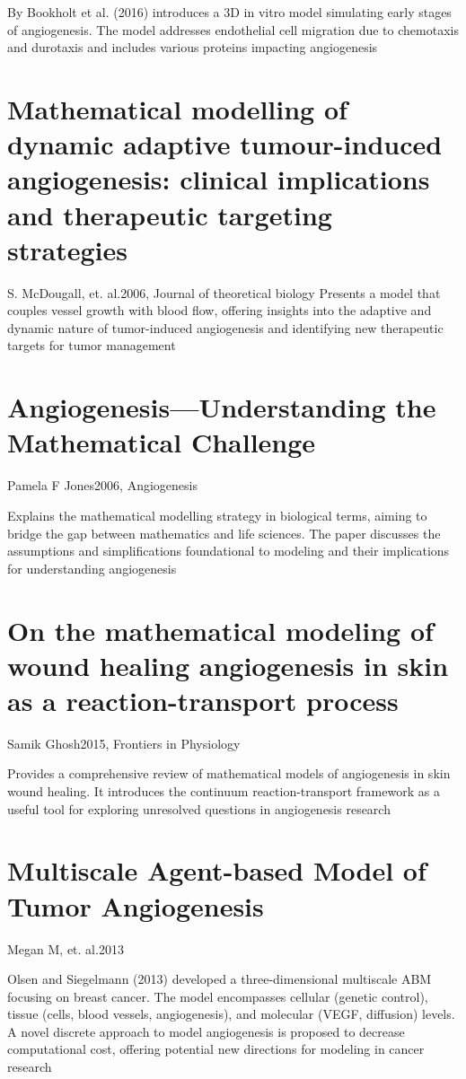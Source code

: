 By Bookholt et al. (2016) introduces a 3D in vitro model simulating early stages of angiogenesis. The model addresses endothelial cell migration due to chemotaxis and durotaxis and includes various proteins impacting angiogenesis \cite{Bookholt2016}

\section{Mathematical modelling of dynamic adaptive tumour-induced angiogenesis: clinical implications and therapeutic targeting strategies}{S. McDougall, et. al.}{2006, Journal of theoretical biology}
Presents a model that couples vessel growth with blood flow, offering insights into the adaptive and dynamic nature of tumor-induced angiogenesis and identifying new therapeutic targets for tumor management \cite{McDougall2006}

\section{Angiogenesis—Understanding the Mathematical Challenge}{Pamela F Jones}{2006, Angiogenesis}

Explains the mathematical modelling strategy in biological terms, aiming to bridge the gap between mathematics and life sciences. The paper discusses the assumptions and simplifications foundational to modeling and their implications for understanding angiogenesis \cite{Jones2006}

\section{On the mathematical modeling of wound healing angiogenesis in skin as a reaction-transport process}{Samik Ghosh}{2015, Frontiers in Physiology}

Provides a comprehensive review of mathematical models of angiogenesis in skin wound healing. It introduces the continuum reaction-transport framework as a useful tool for exploring unresolved questions in angiogenesis research \cite{Ghosh2015} 

\section{Multiscale Agent-based Model of Tumor Angiogenesis}{Megan M, et. al.}{2013}

Olsen and Siegelmann (2013) developed a three-dimensional multiscale ABM focusing on breast cancer. The model encompasses cellular (genetic control), tissue (cells, blood vessels, angiogenesis), and molecular (VEGF, diffusion) levels. A novel discrete approach to model angiogenesis is proposed to decrease computational cost, offering potential new directions for modeling in cancer research \cite{Olsen2013}

